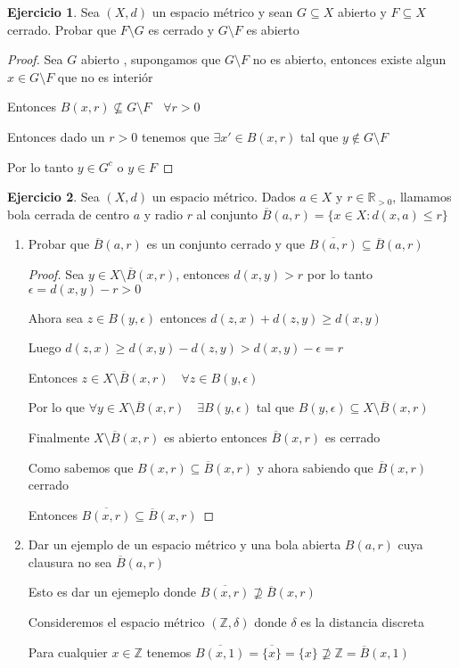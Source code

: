 \documentclass[12pt]{report}
\newcommand{\R}{\mathbb{R}}
\newcommand{\Z}{\mathbb{Z}}
\newcommand{\ol}{\overline}
\theoremstyle{definition}
\newtheorem{ej}{Ejercicio}
\begin{document}
\begin{ej}
  Sea $(X,d)$ un espacio métrico y sean $G \subseteq X$ abierto y $F \subseteq X$ cerrado. Probar que $F \setminus G$ es cerrado y $G \setminus F$ es abierto
  \begin{proof}
 Sea $G$ abierto , supongamos que $G \setminus F$ no es abierto, entonces existe algun $x \in G \setminus F$ que no es interiór     

 Entonces $B(x,r) \not\subseteq G \setminus F \quad \forall r > 0$

 Entonces dado un $r>0$ tenemos que $\exists x' \in B(x,r)$ tal que $y \notin G \setminus F$

 Por lo tanto $y \in G^c $ o $y \in F$
  \end{proof}
\end{ej}

\begin{ej}
Sea $(X,d)$ un espacio métrico. Dados $a \in X$ y $r \in \R_{>0}$, llamamos bola cerrada de centro $a$ y radio $r$ al conjunto $\ol{B}(a,r) = \{x \in X : d(x,a) \leq r\}$
\begin{enumerate}
  \item Probar que $\ol{B}(a,r)$ es un conjunto cerrado y que $\ol{B(a,r)} \subseteq \ol{B}(a,r)$
    \begin{proof}
      Sea $y \in X \setminus \ol{B}(x,r)$, entonces $d(x,y) > r$ por lo tanto $\epsilon = d(x,y) -r > 0$

      Ahora sea $z \in B(y,\epsilon)$ entonces $d(z,x) + d(z,y) \geq d(x,y)$

      Luego $d(z,x) \geq d(x,y) - d(z,y) > d(x,y) - \epsilon = r $

      Entonces $z \in X \setminus \ol{B}(x,r) \quad \forall z \in B(y,\epsilon)$

      Por lo que $\forall y \in X \setminus \ol{B}(x,r) \quad \exists B(y,\epsilon) $ tal que $ B(y,\epsilon) \subseteq X \setminus \ol{B}(x,r)$

      Finalmente $X \setminus \ol{B}(x,r)$ es abierto entonces $\ol{B}(x,r)$ es cerrado

      Como sabemos que $B(x,r)\subseteq \ol{B}(x,r)$ y ahora sabiendo que $\ol{B}(x,r)$ cerrado

      Entonces $\ol{B(x,r)} \subseteq \ol{B}(x,r)$
    \end{proof}
  \item Dar un ejemplo de un espacio métrico y una bola abierta $B(a,r)$ cuya clausura no sea $\ol{B}(a,r)$

    Esto es dar un ejemeplo donde $\ol{B(x,r)} \not\supseteq \ol{B}(x,r)$

    Consideremos el espacio métrico $(\Z,\delta)$ donde $\delta$ es la distancia discreta 

    Para cualquier $x \in \Z$ tenemos $\ol{B(x,1)} = \ol{\{x\}} = \{x\}\not\supseteq \Z = \ol{B}(x,1)$
\end{enumerate}
\end{ej}
\end{document}
